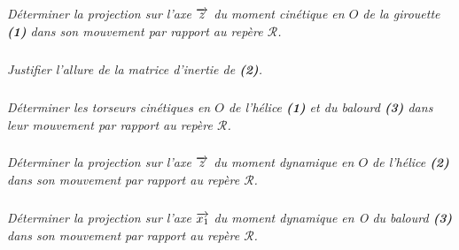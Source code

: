 \documentclass[10pt,fleqn]{article} %
\begin{document}
\begin{multicols}{2}
\subparagraph{}\textit{Déterminer la projection sur l’axe $\overrightarrow{z}$ du moment cinétique en $O$ de la girouette \textbf{(1)} dans son mouvement par rapport au repère $\mathcal{R}$.}

\subparagraph{}\textit{Justifier l’allure de la matrice d’inertie de \textbf{(2)}.}

\subparagraph{}\textit{Déterminer les torseurs cinétiques en $O$ de l’hélice \textbf{(1)} et du balourd \textbf{(3)} dans leur mouvement par rapport au repère $\mathcal{R}$.}

\subparagraph{}\textit{Déterminer la projection sur l’axe $\overrightarrow{z}$ du moment dynamique en $O$ de l’hélice \textbf{(2)} dans son mouvement par rapport au repère $\mathcal{R}$.}

\subparagraph{}\textit{Déterminer la projection sur l’axe $\overrightarrow{x_1}$ du moment dynamique en O du balourd \textbf{(3)} dans son mouvement par rapport au repère $\mathcal{R}$.}


\ifprof
\else
\end{multicols}
\fi


\newpage
\end{document}
